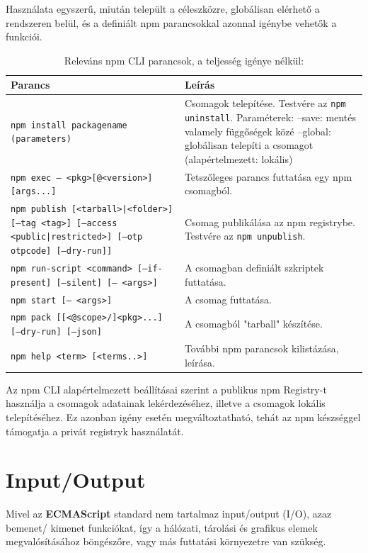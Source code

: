 Használata egyszerű, miután települt a céleszközre, globálisan elérhető a rendszeren belül, és a definiált npm parancsokkal azonnal igénybe vehetők a funkciói.
\begin{table}[h]
	\caption{Releváns npm CLI parancsok, a teljesség igénye nélkül:}
	\label{tab:npm-cli}
	\begin{tabularx}{\textwidth} { 
			| >{\centering\arraybackslash}X 
			| >{\centering\arraybackslash}X |}
		\hline
		\textbf{Parancs} & \textbf{Leírás} \\
		\hline
		\texttt{npm install packagename (parameters)} & Csomagok telepítése. Testvére az \texttt{npm uninstall}. Paraméterek: 
		\newline--save: mentés valamely függőségek közé
		\newline--global: globálisan telepíti a csomagot (alapértelmezett: lokális)
		\\
		\hline
		\texttt{npm exec -- <pkg>[@<version>] [args...]} & Tetszőleges parancs futtatása egy npm csomagból.
		\\
		\hline
		\texttt{npm publish [<tarball>|<folder>] [--tag <tag>] [--access <public|restricted>] [--otp otpcode] [--dry-run]]} & Csomag publikálása az npm registrybe. Testvére az \texttt{npm unpublish}.
		\\
		\hline
		\texttt{npm run-script <command> [--if-present] [--silent] [-- <args>]} & A csomagban definiált szkriptek futtatása.
		\\
		\hline
		\texttt{npm start [-- <args>]} & A csomag futtatása.
		\\
		\hline
		\texttt{npm pack [[<@scope>/]<pkg>...] [--dry-run] [--json]} & A csomagból "tarball" készítése.
		\\
		\hline
		\texttt{npm help <term> [<terms..>]} & További npm parancsok kilistázása, leírása.
		\\
		\hline
	\end{tabularx}
\end{table}

Az npm CLI alapértelmezett beállításai szerint a publikus npm Registry-t használja a csomagok adatainak lekérdezéséhez, illetve a csomagok lokális telepítéséhez. Ez azonban igény esetén megváltoztatható, tehát az npm készséggel támogatja a privát registryk használatát.

\begin{flushright}
	\cite{npm-cli}
\end{flushright}

\pagebreak

\section{Input/Output}

Mivel az \textbf{ECMAScript} standard nem tartalmaz input/output (I/O), azaz bemenet/ kimenet funkciókat, így a hálózati, tárolási és grafikus elemek megvalósításához böngészőre, vagy más futtatási környezetre van szükség.\cite{javascript} 

